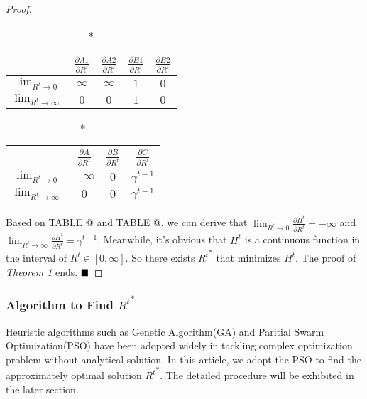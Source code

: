 \documentclass[conference]{IEEEtran}
\makeatletter
\newcommand{\Rmnum}[1]{\expandafter\@slowromancap\romannumeral #1@}
\newtheorem{proof}{Proof}
\makeatother
\begin{document}
\begin{proof}
    \begin{table}
        \centering
        \renewcommand\arraystretch{1.5}
        \begin{tabular}{c  c  c  c  c}
            \hline
                                        & $\frac{\partial A1}{\partial R^t}$ & $\frac{\partial A2}{\partial R^t}$ & $\frac{\partial B1}{\partial R^t}$ & $\frac{\partial B2}{\partial R^t}$ \\
            \hline
            $\lim_{R^t \to 0}$          & $\infty$ & $\infty$ & $1$ & $0$\\
            $\lim_{R^t \to \infty}$     & $0$ & $0$ & $1$ & $0$ \\
            \hline
        \end{tabular}
        \caption{*}
    \end{table}
    \begin{table}
        \centering
        \renewcommand\arraystretch{1.5}
        \begin{tabular}{c  c  c  c}
            \hline
                                        & $\frac{\partial A}{\partial R^t}$ & $\frac{\partial B}{\partial R^t}$ & $\frac{\partial C}{\partial R^t}$ \\
            \hline
            $\lim_{R^t \to 0}$          & $-\infty$ & $0$ & $\gamma^{t-1}$\\
            $\lim_{R^t \to \infty}$     & $0$ & $0$ & $\gamma^{t-1}$\\
            \hline
        \end{tabular}
        \caption{*}
    \end{table}

    Based on TABLE \Rmnum{1} and TABLE \Rmnum{2}, we can derive that $\lim_{R^t \to 0} \frac{\partial H^t}{\partial R^t}= -\infty$ and $\lim_{R^t \to \infty} \frac{\partial H^t}{\partial R^t}= \gamma^{t-1}$.
    Meanwhile, it's obvious that $H^t$ is a continuous function in the interval of $R^t \in [0, \infty]$.
    So there exists ${R^t}^*$ that minimizes $H^t$.
    The proof of \textit{Theorem 1} ends. $\hfill\blacksquare$
\end{proof} \par

\subsubsection{Algorithm to Find ${R^t}^*$}
Heuristic algorithms such as Genetic Algorithm(GA) and Paritial Swarm Optimization(PSO) have been adopted widely in tackling complex optimization problem without analytical solution.
In this article, we adopt the PSO to find the approximately optimal solution ${R^t}^*$.
The detailed procedure will be exhibited in the later section.
\end{document}
